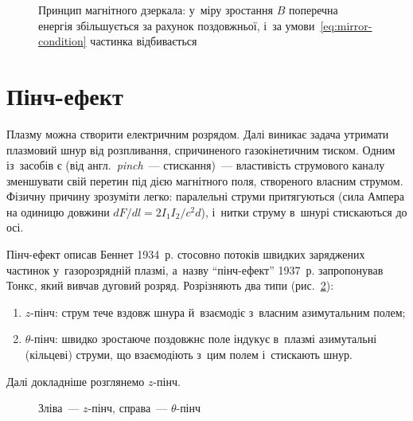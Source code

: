 \begin{figure}[h!]\centering
	\caption{Принцип магнітного дзеркала: у~міру зростання $B$ поперечна енергія
	збільшується за рахунок поздовжньої, і~за умови~\eqref{eq:mirror-condition} частинка
	відбивається}
	\label{pic:magnetic-mirror}
\end{figure}




\section{Пінч-ефект}



Плазму можна створити електричним розрядом. Далі виникає задача утримати плазмовий шнур
від розпливання, спричиненого газокінетичним тиском. Одним із~засобів є 
(від англ.~\emph{pinch}~--- стискання)~--- властивість струмового каналу зменшувати свій
перетин під дією магнітного поля, створеного власним струмом. Фізичну причину зрозуміти
легко: паралельні струми притягуються (сила Ампера на одиницю довжини
$dF/dl=2I_1I_2/c^2d$), і~нитки струму в~шнурі стискаються до осі.

Пінч-ефект описав Беннет 1934~р. стосовно потоків швидких заряджених частинок
у~газорозрядній плазмі, а~назву \enquote{пінч-ефект} 1937~р. запропонував Тонкс, який
вивчав дуговий розряд. Розрізняють два типи (рис.~\ref{pic:pinch-types}):
\begin{enumerate}
	\item $z$-пінч: струм тече вздовж шнура й~взаємодіє з~власним азимутальним полем;
	\item $\theta$-пінч: швидко зростаюче поздовжнє поле індукує в~плазмі азимутальні
	  (кільцеві) струми, що взаємодіють з~цим полем і~стискають шнур.
\end{enumerate}
Далі докладніше розглянемо $z$-пінч.

\begin{figure}[h!]\centering
	\caption{Зліва~--- $z$-пінч, справа~--- $\theta$-пінч}
	\label{pic:pinch-types}
\end{figure}



